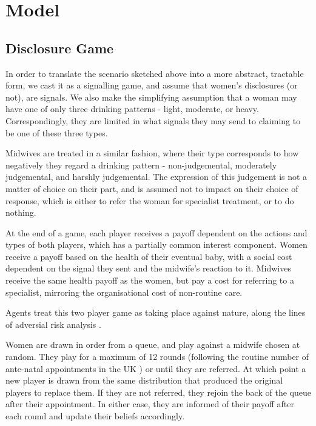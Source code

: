 \section{Model}
\label{sec:model}

\subsection{Disclosure Game}
\label{sub:the_game}

In order to translate the scenario sketched above into a more abstract, tractable form, we cast it as a signalling game, and assume that women's disclosures (or not), are signals. We also make the simplifying assumption that a woman may have one of only three drinking patterns - light, moderate, or heavy. Correspondingly, they are limited in what signals they may send to claiming to be one of these three types.

Midwives are treated in a similar fashion, where their type corresponds to how negatively they regard a drinking pattern - non-judgemental, moderately judgemental, and harshly judgemental. The expression of this judgement is not a matter of choice on their part, and is assumed not to impact on their choice of response, which is either to refer the woman for specialist treatment, or to do nothing.

At the end of a game, each player receives a payoff dependent on the actions and types of both players, which has a partially common interest component. Women receive a payoff based on the health of their eventual baby, with a social cost dependent on the signal they sent and the midwife's reaction to it. Midwives receive the same health payoff as the women, but pay a cost for referring to a specialist, mirroring the organisational cost of non-routine care.



Agents treat this two player game as taking place against nature, along the lines of adversial risk analysis \citep{THINGY}. 

Women are drawn in order from a queue, and play against a midwife chosen at random. They play for a maximum of 12 rounds (following the routine number of ante-natal appointments in the UK \citep{NICE2010a}) or until they are referred. At which point a new player is drawn from the same distribution that produced the original players to replace them. If they are not referred, they rejoin the back of the queue after their appointment. In either case, they are informed of their payoff after each round and update their beliefs accordingly.

